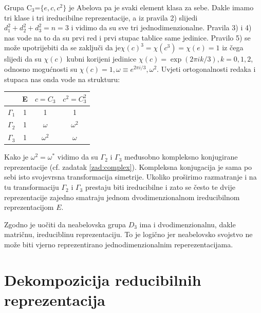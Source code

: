 \begin{primjer}

Grupa C$_3$=$\{e, c, c^2\}$ je Abelova pa je svaki element klasa za sebe.
Dakle imamo tri klase i tri ireducibilne reprezentacije,
a iz pravila 2) slijedi $d_{1}^2+d_{2}^2+d_{3}^2 = n =3$
i vidimo da su sve tri jednodimenzionalne.
Pravila 3) i 4) nas vode na to da su prvi red i prvi stupac
tablice same jedinice.
Pravilo 5) se može upotrijebiti da se zaključi da
je$\chi(c)^3=\chi(c^3)=\chi(e)=1$ iz čega slijedi da su $\chi(c)$
kubni korijeni jedinice $\chi(c) = \exp(2\pi i k/3), k=0, 1, 2$,
odnosno mogućnosti su $\chi(c)=1, \omega\equiv e^{2\pi i/3}, \omega^2$.
Uvjeti ortogonalnosti redaka i stupaca nas onda vode na
strukturu:
\begin{center}
\begin{tabular}{c|ccc}
  & E & $c=C_3$  & $c^2=C_{3}^2$ \\ \hline
$\Gamma_{1}$ & 1 & 1& 1 \\
$\Gamma_{2}$  & 1 & $\omega$ &$\omega^2$  \\
$\Gamma_{3}$  & 1 &$\omega^2$ & $\omega$ 
\end{tabular}
\end{center}
Kako je $\omega^2 = \omega^* $ vidimo da
su $\Gamma_2$ i $\Gamma_3$ međusobno kompleksno
konjugirane reprezentacije (cf. zadatak \ref{zad:complex}).
Kompleksna konjugacija je sama po sebi isto svojevrsna transformacija
simetrije. Ukoliko proširimo razmatranje i na tu transformaciju $\Gamma_2$
i $\Gamma_3$ prestaju biti ireducibilne i zato se često te dvije reprezentacije
zajedno smatraju jednom dvodimenzionalnom ireducibilnom reprezentacijom $E$.
\end{primjer}


Zgodno je uočiti da neabelovska grupa $D_3$ ima i dvodimenzionalnu, dakle matričnu,
ireduciblinu reprezentaciju. To je logično jer neabelovsko svojstvo ne može biti
vjerno reprezentirano jednodimenzionalnim reperezentacijama.

\section{Dekompozicija reducibilnih reprezentacija}


